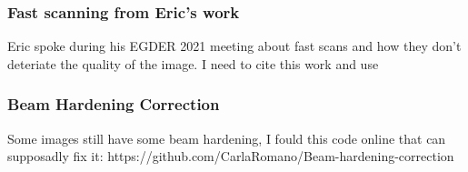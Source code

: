 \documentclass{article}
\begin{document}
\subsubsection{Fast scanning from Eric's work}
Eric spoke during his EGDER	2021 meeting about fast scans and how they don't deteriate the quality of the image. I need to cite this work and use

\subsubsection{Beam Hardening Correction}
Some images still have some beam hardening, I fould this code online that can supposadly fix it: https://github.com/CarlaRomano/Beam-hardening-correction
\end{document}
